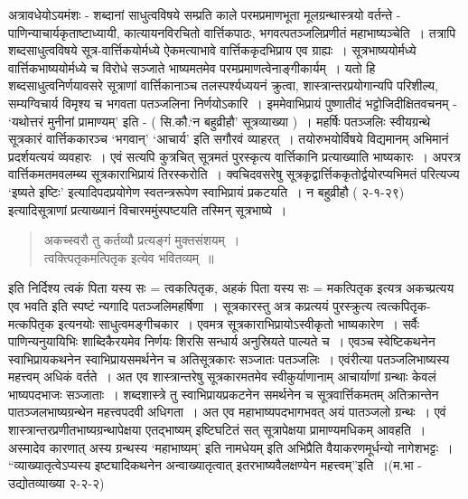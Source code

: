 {अत्रावधेयोऽयमंशः - शब्दानां साधुत्वविषये सम्प्रति काले परमप्रमाणभूता मूलग्रन्थास्त्रयो \hbox{वर्तन्ते} - पाणिन्याचार्यकृताष्टाध्यायी, कात्यायनविरचितो वार्त्तिकपाठः, भगवत्पतञ्जलि\-प्रणीतं महाभाष्यञ्चेति~। तत्रापि शब्दसाधुत्वविषये सूत्र-वार्त्तिकयोर्मध्ये ऐकमत्याभावे वार्त्तिक\break कृदभिप्राय एव ग्राह्यः~। सूत्रभाष्ययोर्मध्ये वार्त्तिकभाष्ययोर्मध्ये च विरोधे सञ्जाते भाष्यमतमेव परमप्रमाणत्वेनाङ्गीकार्यम्~। यतो हि शब्दसाधुत्वनिर्णयावसरे सूत्राणां वार्त्तिकानाञ्च तल\-स्पर्श्यध्ययनं क्रुत्वा, शास्त्रान्तरप्रयोगान्यपि परिशील्य, सम्यग्विचार्य विमृश्य च भगवता \hbox{पतञ्जलिना} निर्णयोऽकारि~। इममेवाभिप्रायं पुष्णातीदं भट्टोजिदीक्षितवचनम् - ‘यथोत्तरं \hbox{मुनीनां} प्रामाण्यम्’ इति - ( सि.कौ.‘न बहुव्रीहौ’ सूत्रव्याख्या )~। महर्षिः पतञ्जलिः स्वीयग्रन्थे सूत्रकारं वार्त्तिककारञ्च ‘भगवान्’ ‘आचार्य’ इति सगौरवं व्याहरत्~। तयोरुभयोर्विषये विद्यमानम् अभिमानं प्रदर्शयत्ययं व्यवहारः~। एवं सत्यपि कुत्रचित् सूत्रमतं पुरस्कृत्य वार्त्तिकानि प्रत्याख्याति भाष्यकारः~। अपरत्र वार्त्तिकमतमवलम्ब्य सूत्रकाराभिप्रायं तिरस्करोति~। क्वचिदवसरेषु सूत्रकृद्वार्त्तिककृतोर्द्वयोरप्यभिमतं परित्यज्य ‘इष्यते इष्टिः’ इत्यादिपदप्रयोगेण \hbox{स्वतन्त्ररूपेण} स्वाभिप्रायं प्रकटयति~। न बहुव्रीहौ ( २-१-२९) इत्यादिसूत्राणां प्रत्याख्यानं विचारममुं\break स्पष्टयति तस्मिन् सूत्रभाष्ये~।
\begin{verse}
अकच्स्वरौ तु कर्तव्यौ प्रत्यङ्गं मुक्तसंशयम्~। \\
त्वक्त्पितृकमत्पितृक इत्येव भवितव्यम्~॥
\end{verse}
इति निर्दिश्य त्वकं पिता यस्य सः = त्वकत्पितृक, अहकं पिता यस्य सः = मकत्पितृक इत्यत्र अकच्\enginline{-}प्रत्यय एव भवति इति स्पष्टं न्यगादि पतञ्जलिमहर्षिणा~। सूत्रकारस्तु अत्र कप्रत्ययं पुरस्क्रुत्य त्वत्कपितृक-मत्कपितृक इत्यनयोः साधुत्वमङ्गीचकार~। एवमत्र सूत्रकाराभिप्रायोऽस्वीकृतो भाष्यकारेण~। सर्वैः पाणिन्यनुयायिभिः शाब्दिकैरयमेव निर्णयः शिरसि सन्धार्य अनुस्रियते पाल्यते च~। एवञ्च स्वेष्टिकथनेन स्वाभिप्रायकथनेन स्वाभिप्रायसमर्थनेन च अतिसूत्रकारः सञ्जातः पतञ्जलिः~। एवंरीत्या पतञ्जलिभाष्यस्य महत्त्वम् अधिकं वर्तते~। अत एव शास्त्रान्तरेषु सूत्रकारमतमेव स्वीकुर्याणानाम् आचार्याणां ग्रन्थाः केवलं भाष्यपदभाजः सञ्जाताः~। शब्दशास्त्रे तु स्वाभिप्रायप्रकटनेन समर्थनेन च सूत्रवार्त्तिकमतम् अतिक्रान्तेन पातञ्जलभाष्यग्रन्थेन महत्त्वपदवी अधिगता~। अत एव महाभाष्यपदभागभवत् अयं पातञ्जलो ग्रन्थः~। एवं शास्त्रान्तरप्रणीतभाष्यग्रन्थापेक्षया एतद्भाष्यम् इष्टिघटितं सत् सूत्रापेक्षया प्रामाण्यमधिकम् आवहति~। अस्मादेव कारणात् अस्य ग्रन्थस्य ‘महाभाष्यम्’ इति नामधेयम् इति \hbox{अभिप्रैति} वैयाकरणमूर्धन्यो नागेशभट्टः~। “व्याख्यातृत्वेऽप्यस्य इष्ट्यादिकथनेन अन्वाख्यातृत्वात् \hbox{इतरभाष्यवैलक्षण्येन} महत्त्वम्”इति~।(म.भा - उद्योतव्याख्या २-२-२)
~\\[-0.75cm]
}
